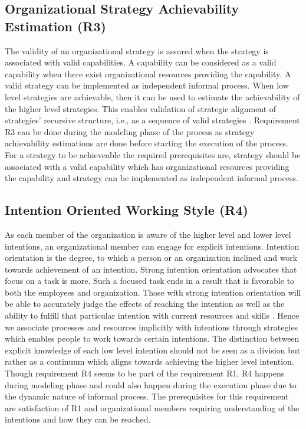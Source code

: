 \subsection{Organizational Strategy Achievability Estimation (R3)}
The validity of an organizational strategy is assured when the strategy is associated with valid capabilities. A capability can be considered as a valid capability when there exist organizational resources providing the capability. A valid strategy can be implemented as independent informal process. When low level strategies are achievable, then it can be used to estimate the achievability of the higher level strategies. This enables validation of strategic alignment of strategies' recursive structure, i.e., as a sequence of valid strategies \cite{Bleistein2006}. Requirement R3  can be done during the modeling phase of the process as strategy achievability estimations are done before starting the execution of the process. For a strategy to be achieveable the required prerequisites are, strategy should be associated with a valid capability which has organizational resources providing the capability and strategy can be implemented as independent informal process.
 
\subsection{Intention Oriented Working Style (R4)}
As each member of the organization is aware of the higher level and lower level intentions, an organizational member can engage for explicit intentions. Intention orientation is the degree, to which a person or an organization inclined and work towards achievement of an intention. Strong intention orientation advocates that focus on a task is more. Such a focused task ends in a result that is favorable to both the employees and organization. Those with strong intention orientation will be able to accurately judge the effects of reaching the intention as well as the ability to fulfill that particular intention with current resources and skills \cite{Lacom}. Hence we associate processes and resources implicitly with intentions through strategies which enables people to work towards certain intentions. The distinction between explicit knowledge of each low level intention should not be seen as a division but rather as a continuum which aligns towards achieving the higher level intention. Though requirement R4 seems to be part of the requirement R1, R4 happens during modeling phase and could also happen during the execution phase due to the dynamic nature of informal process. The prerequisites for this requirement are satisfaction of R1 and organizational members requiring understanding of the intentions and how they can be reached.  

